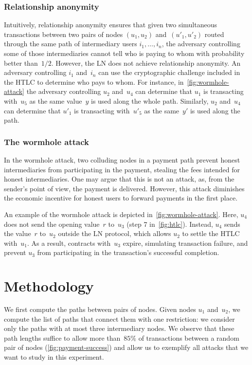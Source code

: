 \subsubsection*{Relationship anonymity}
Intuitively, relationship anonymity ensures that given two simultaneous transactions between two pairs of nodes $(u_1, u_2)$ and~$(u'_1, u'_2)$ routed through the same path of intermediary users $i_1, \ldots, i_n$, the adversary controlling some of those intermediaries cannot tell who is paying to whom with probability better than~$1/2$.
However, the LN does not achieve relationship anonymity.
An adversary controlling $i_1$ and~$i_n$ can use the cryptographic challenge included in the HTLC to determine who pays to whom.
For instance, in~\cref{fig:wormhole-attack} the adversary controlling $u_2$ and~$u_4$ can determine that $u_1$ is transacting with~$u_5$ as the same value~$y$ is used along the whole path.
Similarly, $u_2$ and~$u_4$ can determine that $u'_1$ is transacting with~$u'_5$ as the same~$y'$ is used along the path.

\subsubsection*{The wormhole attack}
In the wormhole attack, two colluding nodes in a payment path prevent honest intermediaries from participating in the payment, stealing the fees intended for honest intermediaries.
One may argue that this is not an attack, as, from the sender's point of view, the payment is delivered.
However, this attack diminishes the economic incentive for honest users to forward payments in the first place.

An example of the wormhole attack is depicted in~\cref{fig:wormhole-attack}.
Here, $u_4$ does not send the opening value~$r$ to~$u_3$ (step 7 in~\cref{fig:htlc}).
Instead, $u_4$ sends the value~$r$ to~$u_2$ outside the LN protocol, which allows $u_2$ to settle the HTLC with~$u_1$.
As a result, contracts with~$u_3$ expire, simulating transaction failure, and prevent $u_3$ from participating in the transaction's successful completion.


\section{Methodology}

We first compute the paths between pairs of nodes.
Given nodes $u_1$ and~$u_2$, we compute the list of paths that connect them with one restriction: we consider only the paths with at most three intermediary nodes.
We observe that these path lengths suffice to allow more than~$85\%$ of transactions between a random pair of nodes (\cref{fig:payment-success}) and allow us to exemplify all attacks that we want to study in this experiment.


